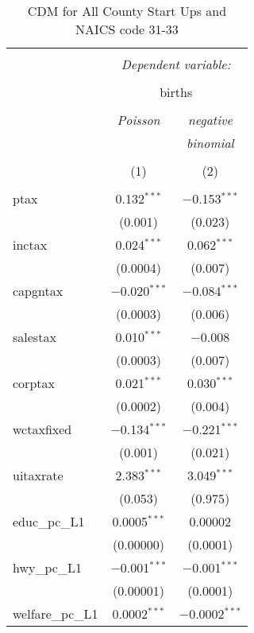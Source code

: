 
\begin{table}[!htbp] \centering 
  \caption{CDM for All County Start Ups and NAICS code 31-33} 
  \label{} 
\begin{tabular}{@{\extracolsep{5pt}}lcc} 
\\[-1.8ex]\hline 
\hline \\[-1.8ex] 
 & \multicolumn{2}{c}{\textit{Dependent variable:}} \\ 
\cline{2-3} 
\\[-1.8ex] & \multicolumn{2}{c}{births} \\ 
\\[-1.8ex] & \textit{Poisson} & \textit{negative} \\ 
 & \textit{} & \textit{binomial} \\ 
\\[-1.8ex] & (1) & (2)\\ 
\hline \\[-1.8ex] 
 ptax & 0.132$^{***}$ & $-$0.153$^{***}$ \\ 
  & (0.001) & (0.023) \\ 
  inctax & 0.024$^{***}$ & 0.062$^{***}$ \\ 
  & (0.0004) & (0.007) \\ 
  capgntax & $-$0.020$^{***}$ & $-$0.084$^{***}$ \\ 
  & (0.0003) & (0.006) \\ 
  salestax & 0.010$^{***}$ & $-$0.008 \\ 
  & (0.0003) & (0.007) \\ 
  corptax & 0.021$^{***}$ & 0.030$^{***}$ \\ 
  & (0.0002) & (0.004) \\ 
  wctaxfixed & $-$0.134$^{***}$ & $-$0.221$^{***}$ \\ 
  & (0.001) & (0.021) \\ 
  uitaxrate & 2.383$^{***}$ & 3.049$^{***}$ \\ 
  & (0.053) & (0.975) \\ 
  educ\_pc\_L1 & 0.0005$^{***}$ & 0.00002 \\ 
  & (0.00000) & (0.0001) \\ 
  hwy\_pc\_L1 & $-$0.001$^{***}$ & $-$0.001$^{***}$ \\ 
  & (0.00001) & (0.0001) \\ 
  welfare\_pc\_L1 & 0.0002$^{***}$ & $-$0.0002$^{***}$ \\ 

\end{tabular}
\end{table}

